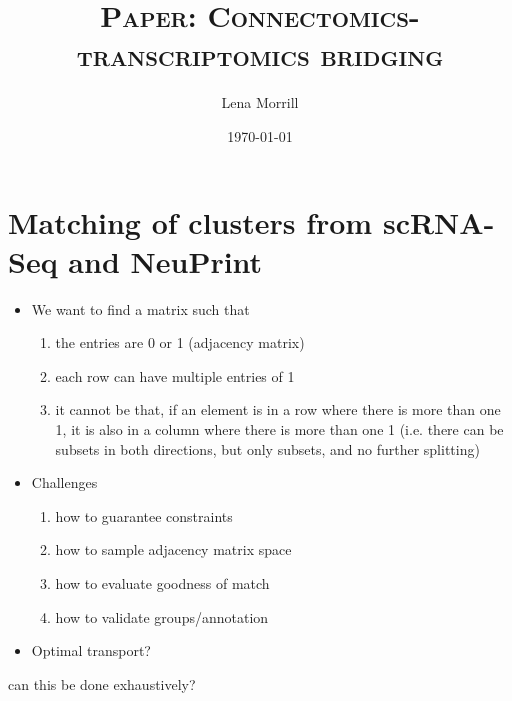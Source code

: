 \documentclass{article}
\title{ \textsc{Paper: Connectomics-transcriptomics bridging}}
\author{Lena Morrill}
\date{\today}
\begin{document}
\maketitle


\section{Matching of clusters from scRNA-Seq and NeuPrint}
\begin{itemize}
\item We want to find a matrix such that          
\begin{enumerate}
\item the entries are 0 or 1 (adjacency matrix)
\item each row can have multiple entries of 1
\item it cannot be that, if an element is in a row where there is more than one 1, it is also in a column where there is more than one 1 (i.e. there can be subsets in both directions, but only subsets, and no further splitting)
\end{enumerate}
\item Challenges
\begin{enumerate}
\item how to guarantee constraints
\item how to sample adjacency matrix space
\item how to evaluate goodness of match
\item how to validate groups/annotation
\end{enumerate}
\item Optimal transport?
\end{itemize}

can this be done exhaustively?
\end{document}
